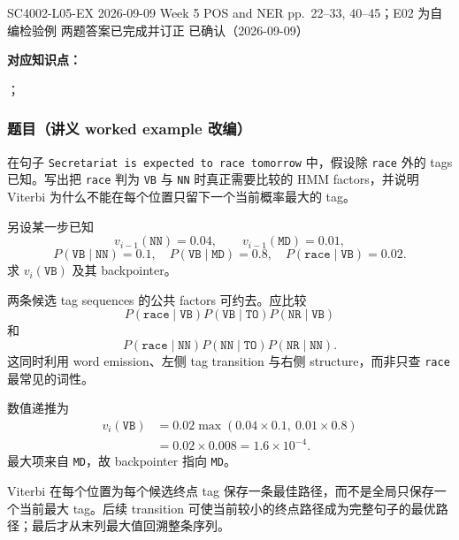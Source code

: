 

\examplemeta
  {SC4002-L05-EX}
  {2026-09-09}
  {Week 5 POS and NER pp.~22--33, 40--45；E02 为自编检验例}
  {两题答案已完成并订正}
  {已确认（2026-09-09）}


\textbf{对应知识点：}\par
{}；\par
{}

\subsubsection*{题目（讲义 worked example 改编）}

在句子 \texttt{Secretariat is expected to race tomorrow} 中，假设除 \texttt{race} 外的 tags 已知。写出把 \texttt{race} 判为 \texttt{VB} 与 \texttt{NN} 时真正需要比较的 HMM factors，并说明 Viterbi 为什么不能在每个位置只留下一个当前概率最大的 tag。

另设某一步已知
\[
  v_{i-1}(\texttt{NN})=0.04,
  \qquad v_{i-1}(\texttt{MD})=0.01,
\]
\[
  P(\texttt{VB}\mid\texttt{NN})=0.1,
  \quad P(\texttt{VB}\mid\texttt{MD})=0.8,
  \quad P(\texttt{race}\mid\texttt{VB})=0.02.
\]
求 $v_i(\texttt{VB})$ 及其 backpointer。

\begin{workedsolution}
两条候选 tag sequences 的公共 factors 可约去。应比较
\[
  P(\texttt{race}\mid\texttt{VB})
  P(\texttt{VB}\mid\texttt{TO})
  P(\texttt{NR}\mid\texttt{VB})
\]
和
\[
  P(\texttt{race}\mid\texttt{NN})
  P(\texttt{NN}\mid\texttt{TO})
  P(\texttt{NR}\mid\texttt{NN}).
\]
这同时利用 word emission、左侧 tag transition 与右侧 structure，而非只查 \texttt{race} 最常见的词性。

数值递推为
\[
\begin{aligned}
  v_i(\texttt{VB})
  &=0.02\max(0.04\times0.1,\ 0.01\times0.8)\\
  &=0.02\times0.008
   =1.6\times10^{-4}.
\end{aligned}
\]
最大项来自 \texttt{MD}，故 backpointer 指向 \texttt{MD}。

Viterbi 在每个位置为每个候选终点 tag 保存一条最佳路径，而不是全局只保存一个当前最大 tag。后续 transition 可使当前较小的终点路径成为完整句子的最优路径；最后才从末列最大值回溯整条序列。
\end{workedsolution}

